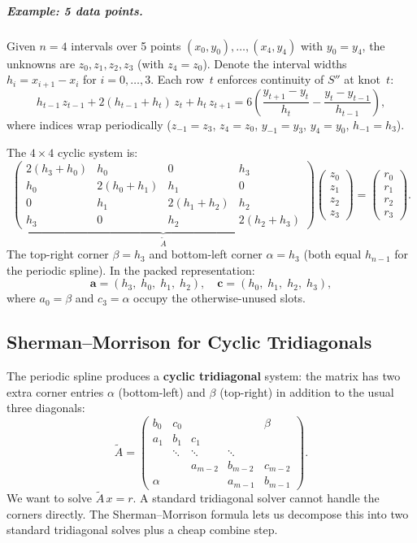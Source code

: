 \documentclass[11pt]{article}
\begin{document}
\subparagraph{Example: 5 data points.}
Given $n=4$ intervals over 5 points $(x_0, y_0), \ldots, (x_4, y_4)$ with
$y_0 = y_4$, the unknowns are $z_0, z_1, z_2, z_3$ (with $z_4 = z_0$).
Denote the interval widths $h_i = x_{i+1} - x_i$ for $i = 0,\ldots,3$.
Each row~$t$ enforces continuity of $S''$ at knot~$t$:
\[
h_{t-1}\,z_{t-1} + 2(h_{t-1}+h_t)\,z_t + h_t\,z_{t+1}
= 6\!\left(\frac{y_{t+1}-y_t}{h_t} - \frac{y_t - y_{t-1}}{h_{t-1}}\right),
\]
where indices wrap periodically ($z_{-1} = z_3$, $z_4 = z_0$,
$y_{-1} = y_3$, $y_4 = y_0$, $h_{-1} = h_3$).

The $4\times 4$ cyclic system is:
\[
\underbrace{
\begin{pmatrix}
2(h_3+h_0) & h_0        & 0          & h_3        \\
h_0        & 2(h_0+h_1) & h_1        & 0          \\
0          & h_1        & 2(h_1+h_2) & h_2        \\
h_3        & 0          & h_2        & 2(h_2+h_3)
\end{pmatrix}
}_{\tilde{A}}
\begin{pmatrix} z_0 \\ z_1 \\ z_2 \\ z_3 \end{pmatrix}
=
\begin{pmatrix} r_0 \\ r_1 \\ r_2 \\ r_3 \end{pmatrix}.
\]
The top-right corner $\beta = h_3$ and bottom-left corner $\alpha = h_3$
(both equal $h_{n-1}$ for the periodic spline).
In the packed representation:
\[
\mathbf{a} = (h_3,\; h_0,\; h_1,\; h_2), \quad
\mathbf{c} = (h_0,\; h_1,\; h_2,\; h_3),
\]
where $a_0 = \beta$ and $c_3 = \alpha$ occupy the otherwise-unused slots.

\subsection{Sherman--Morrison for Cyclic Tridiagonals}

The periodic spline produces a \textbf{cyclic tridiagonal} system:
the matrix has two extra corner entries $\alpha$ (bottom-left) and
$\beta$ (top-right) in addition to the usual three diagonals:
\[
\tilde{A} =
\begin{pmatrix}
b_0    & c_0    &        &          & \beta  \\
a_1    & b_1    & c_1    &          &        \\
       & \ddots & \ddots & \ddots   &        \\
       &        & a_{m-2}& b_{m-2}  & c_{m-2}\\
\alpha &        &        & a_{m-1}  & b_{m-1}
\end{pmatrix}.
\]
We want to solve $\tilde{A}\,x = r$.
A standard tridiagonal solver cannot handle the corners directly.
The Sherman--Morrison formula lets us decompose this into two
standard tridiagonal solves plus a cheap combine step.
\end{document}
